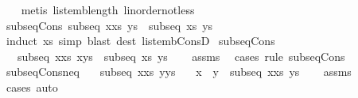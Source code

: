 \begin{isabellebody}
%
\isadelimproof
\ \ %
\endisadelimproof
%
\isatagproof
{}\isamarkupfalse%
\ {\isacharparenleft}metis\ list{\isacharunderscore}emb{\isacharunderscore}length\ linorder{\isacharunderscore}not{\isacharunderscore}less{\isacharparenright}%
\endisatagproof
{\isafoldproof}%
%
\isadelimproof
\isanewline
%
\endisadelimproof
\isanewline
{}\isamarkupfalse%
\ subseq{\isacharunderscore}Cons{\isacharprime}{\isacharcolon}\ {\isachardoublequoteopen}subseq\ {\isacharparenleft}x{\isacharhash}xs{\isacharparenright}\ ys\ {\isasymLongrightarrow}\ subseq\ xs\ ys{\isachardoublequoteclose}\isanewline
%
\isadelimproof
\ \ %
\endisadelimproof
%
\isatagproof
{}\isamarkupfalse%
\ {\isacharparenleft}induct\ xs{\isacharcomma}\ simp{\isacharcomma}\ blast\ dest{\isacharcolon}\ list{\isacharunderscore}emb{\isacharunderscore}ConsD{\isacharparenright}%
\endisatagproof
{\isafoldproof}%
%
\isadelimproof
\isanewline
%
\endisadelimproof
\isanewline
{}\isamarkupfalse%
\ subseq{\isacharunderscore}Cons{}{\isacharprime}{\isacharcolon}\isanewline
\ \ \ {\isachardoublequoteopen}subseq\ {\isacharparenleft}x{\isacharhash}xs{\isacharparenright}\ {\isacharparenleft}x{\isacharhash}ys{\isacharparenright}{\isachardoublequoteclose}\ \ {\isachardoublequoteopen}subseq\ xs\ ys{\isachardoublequoteclose}\isanewline
%
\isadelimproof
\ \ %
\endisadelimproof
%
\isatagproof
{}\isamarkupfalse%
\ assms\ \isamarkupfalse%
\ {\isacharparenleft}cases{\isacharparenright}\ {\isacharparenleft}rule\ subseq{\isacharunderscore}Cons{\isacharprime}{\isacharparenright}%
\endisatagproof
{\isafoldproof}%
%
\isadelimproof
\isanewline
%
\endisadelimproof
\isanewline
{}\isamarkupfalse%
\ subseq{\isacharunderscore}Cons{}{\isacharunderscore}neq{\isacharcolon}\isanewline
\ \ \ {\isachardoublequoteopen}subseq\ {\isacharparenleft}x{\isacharhash}xs{\isacharparenright}\ {\isacharparenleft}y{\isacharhash}ys{\isacharparenright}{\isachardoublequoteclose}\isanewline
\ \ \ {\isachardoublequoteopen}x\ {\isasymnoteq}\ y\ {\isasymLongrightarrow}\ subseq\ {\isacharparenleft}x{\isacharhash}xs{\isacharparenright}\ ys{\isachardoublequoteclose}\isanewline
%
\isadelimproof
\ \ %
\endisadelimproof
%
\isatagproof
{}\isamarkupfalse%
\ assms\ \isamarkupfalse%
\ {\isacharparenleft}cases{\isacharparenright}\ auto%
\endisatagproof
{\isafoldproof}%
%
\isadelimproof
\isanewline
%
\endisadelimproof
\isanewline
{}\isamarkupfalse%

\end{isabellebody}
